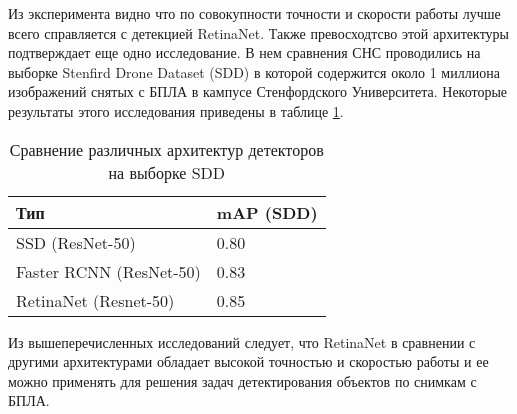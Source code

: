   Из эксперимента видно что по совокупности точности и скорости работы лучше всего справляется с детекцией RetinaNet. Также превосходтсво этой архитектуры подтверждает еще одно исследование. В нем сравнения СНС проводились на выборке Stenfird Drone Dataset (SDD) в которой содержится около 1 миллиона изображений снятых с БПЛА в кампусе Стенфордского Университета. Некоторые результаты этого исследования приведены в таблице \ref{leaderboard-table-sdd}.

  \begin{table}[H]
    \caption{Сравнение различных архитектур детекторов на выборке SDD}\label{leaderboard-table-sdd}
    \begin{tabular}{|p{7cm}|p{5cm}|}
    \hline
    {Тип} & {mAP (SDD)} \\
    \hline
    SSD (ResNet-50) & 0.80 \\
    \hline
    Faster RCNN (ResNet-50) & 0.83 \\
    \hline
    RetinaNet (Resnet-50) & 0.85 \\
    \hline
    \end{tabular}
  \end{table}

  Из вышеперечисленных исследований следует, что RetinaNet в сравнении с другими архитектурами обладает высокой точностью и скоростью работы и ее можно применять для решения задач детектирования объектов по снимкам с БПЛА.
